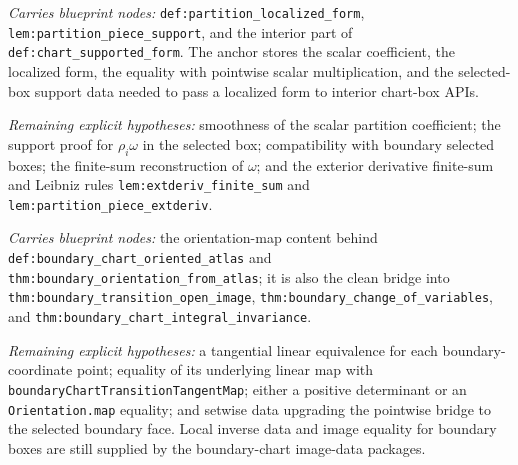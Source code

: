 \begin{definition}
  \label{anc:localized_form_data}
  \leanok
  \emph{Carries blueprint nodes:}
  \texttt{def:partition\_localized\_form},
  \texttt{lem:partition\_piece\_support}, and the interior part of
  \texttt{def:chart\_supported\_form}.  The anchor stores the scalar
  coefficient, the localized form, the equality with pointwise scalar
  multiplication, and the selected-box support data needed to pass a localized
  form to interior chart-box APIs.

  \emph{Remaining explicit hypotheses:}
  smoothness of the scalar partition coefficient; the support proof for
  \(\rho_i \omega\) in the selected box; compatibility with boundary selected
  boxes; the finite-sum reconstruction of \(\omega\); and the exterior
  derivative finite-sum and Leibniz rules
  \texttt{lem:extderiv\_finite\_sum} and
  \texttt{lem:partition\_piece\_extderiv}.
\end{definition}

\begin{definition}
  \label{anc:boundary_chart_orientation_map_data}
  \leanok
  \emph{Carries blueprint nodes:}
  the orientation-map content behind
  \texttt{def:boundary\_chart\_oriented\_atlas} and
  \texttt{thm:boundary\_orientation\_from\_atlas}; it is also the clean bridge
  into \texttt{thm:boundary\_transition\_open\_image},
  \texttt{thm:boundary\_change\_of\_variables}, and
  \texttt{thm:boundary\_chart\_integral\_invariance}.

  \emph{Remaining explicit hypotheses:}
  a tangential linear equivalence for each boundary-coordinate point; equality
  of its underlying linear map with
  \texttt{boundaryChartTransitionTangentMap}; either a positive determinant or
  an \texttt{Orientation.map} equality; and setwise data upgrading the
  pointwise bridge to the selected boundary face.  Local inverse data and image
  equality for boundary boxes are still supplied by the boundary-chart
  image-data packages.
\end{definition}

